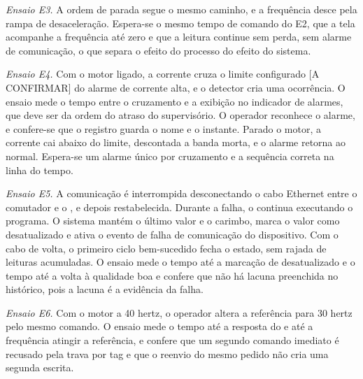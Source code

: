 \par \emph{Ensaio E3.} A ordem de parada segue o mesmo caminho, e a frequência desce pela rampa de desaceleração. Espera-se o mesmo tempo de comando do E2, que a tela acompanhe a frequência até zero e que a leitura continue sem perda, sem alarme de comunicação, o que separa o efeito do processo do efeito do sistema.

\par \emph{Ensaio E4.} Com o motor ligado, a corrente cruza o limite configurado [A CONFIRMAR] do alarme de corrente alta, e o detector cria uma ocorrência. O ensaio mede o tempo entre o cruzamento e a exibição no indicador de alarmes, que deve ser da ordem do atraso do supervisório. O operador reconhece o alarme, e confere-se que o registro guarda o nome e o instante. Parado o motor, a corrente cai abaixo do limite, descontada a banda morta, e o alarme retorna ao normal. Espera-se um alarme único por cruzamento e a sequência correta na linha do tempo.

\par \emph{Ensaio E5.} A comunicação é interrompida desconectando o cabo Ethernet entre o comutador e o , e depois restabelecida. Durante a falha, o  continua executando o programa. O sistema mantém o último valor e o carimbo, marca o valor como desatualizado e ativa o evento de falha de comunicação do dispositivo. Com o cabo de volta, o primeiro ciclo bem-sucedido fecha o estado, sem rajada de leituras acumuladas. O ensaio mede o tempo até a marcação de desatualizado e o tempo até a volta à qualidade boa e confere que não há lacuna preenchida no histórico, pois a lacuna é a evidência da falha.

\par \emph{Ensaio E6.} Com o motor a 40 hertz, o operador altera a referência para 30 hertz pelo mesmo comando. O ensaio mede o tempo até a resposta do  e até a frequência atingir a referência, e confere que um segundo comando imediato é recusado pela trava por tag e que o reenvio do mesmo pedido não cria uma segunda escrita.

